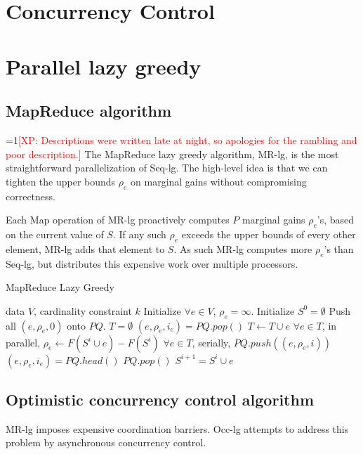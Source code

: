 \documentclass{article}
\newcommand{\Comments}{1}
\newcommand{\note}[2]{\ifnum\Comments=1\textcolor{#1}{#2}\fi}
\newcommand{\xinghao}[1]{\note{red}{[XP: #1]}}
\newcommand{\seqlz}{Seq-lg}
\newcommand{\mrlz}{MR-lg}
\newcommand{\occlz}{Occ-lg}
\begin{document}
\section{Concurrency Control}
\label{sec:concurrencycontrol}

\section{Parallel lazy greedy}
\label{sec:parlazy}

\subsection{MapReduce algorithm}
\xinghao{Descriptions were written late at night, so apologies for the rambling and poor description.}
The MapReduce lazy greedy algorithm, \mrlz{}, is the most straightforward parallelization of \seqlz{}.
The high-level idea is that we can tighten the upper bounds $\rho_e$ on marginal gains without compromising correctness.

Each Map operation of \mrlz{} proactively computes $P$ marginal gains $\rho_e$'s, based on the current value of $S$.
If any such $\rho_e$ exceeds the upper bounds of every other element, \mrlz{} adds that element to $S$.
As such \mrlz{} computes more $\rho_e$'s than \seqlz{}, but distributes this expensive work over multiple processors.
\begin{algorithm}[tb]
  \caption{MapReduce Lazy Greedy}
  \label{alg:mrlz}
\begin{algorithmic}[1]
   data $V$, cardinality constraint $k$
  \STATE Initialize $\forall e \in V$, $\rho_e = \infty$.
  \STATE Initialize $S^0 = \emptyset$
  \STATE Push all $(e, \rho_e, 0)$ onto $PQ$.
      \STATE $T = \emptyset$
        \STATE $(e, \rho_e, i_e) = PQ.pop()$
        \STATE $T \leftarrow T \cup e$
      \ENDFOR
      \STATE $\forall e \in T$, in parallel, $\rho_e \leftarrow F(S^i\cup e) - F(S^i)$
      \STATE $\forall e \in T$, serially, $PQ.push((e, \rho_e, i))$
      \STATE $(e, \rho_e, i_e) = PQ.head()$
        \STATE $PQ.pop()$
        \STATE $S^{i+1} = S^i \cup e$
      \ENDIF
    \ENDWHILE
  \ENDFOR
\end{algorithmic}
\end{algorithm}



\subsection{Optimistic concurrency control algorithm}
\mrlz{} imposes expensive coordination barriers.
\occlz{} attempts to address this problem by asynchronous concurrency control.
\end{document}
